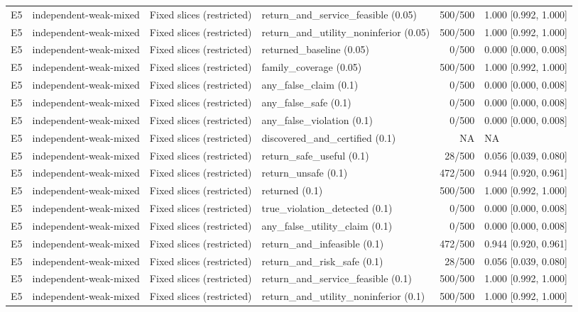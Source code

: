 \begin{longtable}{p{.04\linewidth}p{.18\linewidth}p{.19\linewidth}p{.16\linewidth}r p{.21\linewidth}}
E5 & independent-weak-mixed & Fixed slices (restricted) & return\_and\_service\_feasible (0.05) & 500/500 & 1.000 [0.992, 1.000]\\
E5 & independent-weak-mixed & Fixed slices (restricted) & return\_and\_utility\_noninferior (0.05) & 500/500 & 1.000 [0.992, 1.000]\\
E5 & independent-weak-mixed & Fixed slices (restricted) & returned\_baseline (0.05) & 0/500 & 0.000 [0.000, 0.008]\\
E5 & independent-weak-mixed & Fixed slices (restricted) & family\_coverage (0.05) & 500/500 & 1.000 [0.992, 1.000]\\
E5 & independent-weak-mixed & Fixed slices (restricted) & any\_false\_claim (0.1) & 0/500 & 0.000 [0.000, 0.008]\\
E5 & independent-weak-mixed & Fixed slices (restricted) & any\_false\_safe (0.1) & 0/500 & 0.000 [0.000, 0.008]\\
E5 & independent-weak-mixed & Fixed slices (restricted) & any\_false\_violation (0.1) & 0/500 & 0.000 [0.000, 0.008]\\
E5 & independent-weak-mixed & Fixed slices (restricted) & discovered\_and\_certified (0.1) & NA & NA\\
E5 & independent-weak-mixed & Fixed slices (restricted) & return\_safe\_useful (0.1) & 28/500 & 0.056 [0.039, 0.080]\\
E5 & independent-weak-mixed & Fixed slices (restricted) & return\_unsafe (0.1) & 472/500 & 0.944 [0.920, 0.961]\\
E5 & independent-weak-mixed & Fixed slices (restricted) & returned (0.1) & 500/500 & 1.000 [0.992, 1.000]\\
E5 & independent-weak-mixed & Fixed slices (restricted) & true\_violation\_detected (0.1) & 0/500 & 0.000 [0.000, 0.008]\\
E5 & independent-weak-mixed & Fixed slices (restricted) & any\_false\_utility\_claim (0.1) & 0/500 & 0.000 [0.000, 0.008]\\
E5 & independent-weak-mixed & Fixed slices (restricted) & return\_and\_infeasible (0.1) & 472/500 & 0.944 [0.920, 0.961]\\
E5 & independent-weak-mixed & Fixed slices (restricted) & return\_and\_risk\_safe (0.1) & 28/500 & 0.056 [0.039, 0.080]\\
E5 & independent-weak-mixed & Fixed slices (restricted) & return\_and\_service\_feasible (0.1) & 500/500 & 1.000 [0.992, 1.000]\\
E5 & independent-weak-mixed & Fixed slices (restricted) & return\_and\_utility\_noninferior (0.1) & 500/500 & 1.000 [0.992, 1.000]\\

\end{longtable}
